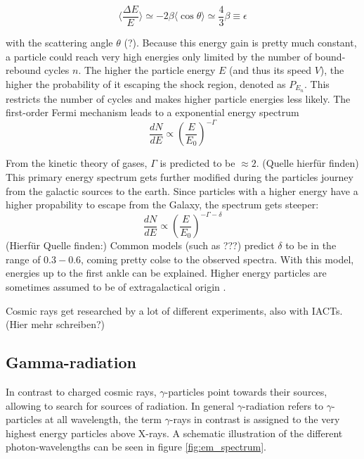 \begin{equation}
	\langle \frac{\Delta E}{E} \rangle 
	\simeq -2\beta \langle \cos{\theta} \rangle
	\simeq \frac{4}{3}\beta
	\equiv \epsilon
\end{equation}

with the scattering angle $\theta$ (?).
Because this energy gain is pretty much constant, a particle could reach very high 
energies only limited by the number of bound-rebound cycles $n$.
The higher the particle energy $E$ (and thus its speed $V$), 
the higher the probability of it escaping the shock region, denoted 
as $P_{E_n}$.
This restricts the number of cycles and makes higher particle energies 
less likely.
The first-order Fermi mechanism leads to a exponential energy spectrum 
\begin{equation}
	\frac{dN}{dE} \propto \left(\frac{E}{E_0}\right)^{-\Gamma}
\end{equation}

From the kinetic theory of gases, $\Gamma$ is predicted to 
be $\approx 2$.
(Quelle hierfür finden)
This primary energy spectrum gets further modified during the particles 
journey from the galactic sources to the earth.
Since particles with a higher energy have a higher propability to escape 
from the Galaxy, the spectrum gets steeper:
\begin{equation}
	\frac{dN}{dE} \propto \left(\frac{E}{E_0}\right)^{-\Gamma-\delta}
\end{equation}
(Hierfür Quelle finden:)
Common models (such as ???) predict $\delta$ to be in the range of 
$0.3-0.6$, coming pretty colse to the observed spectra.
With this model, energies up to the first ankle can be explained.
Higher energy particles are sometimes assumed to be of extragalactical origin
\cite{Baring:1997ka}.

Cosmic rays get researched by a lot of different experiments,
also with IACTs. 
(Hier mehr schreiben?)


\subsection{Gamma-radiation}
In contrast to charged cosmic rays, $\gamma$-particles point towards
their sources, allowing to search for sources of radiation.
In general $\gamma$-radiation refers to $\gamma$-particles at all wavelength,
the term $\gamma$-rays in contrast is assigned to the very highest energy particles
above X-rays.
A schematic illustration of the different photon-wavelengths
can be seen in figure \ref{fig:em_spectrum}.

